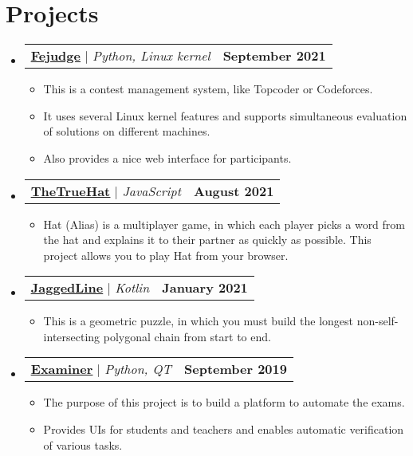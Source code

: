 \documentclass[letterpaper,11pt]{article}
\makeatletter
\newcommand{\resumeItem}[1]{
    \item\small{
        {#1 \vspace{-2pt}}
    }
}
\newcommand{\resumeProjectHeading}[2]{
    \item
    \begin{tabular*}{1.001\textwidth}{l@{\extracolsep{\fill}}r}
        \small#1 & \textbf{\small #2}\\
    \end{tabular*}\vspace{-7pt}
}
\newcommand{\resumeSubHeadingListStart}{\begin{itemize}[leftmargin=0.0in, label={}]}
\newcommand{\resumeSubHeadingListEnd}{\end{itemize}}
\newcommand{\resumeItemListStart}{\begin{itemize}}
\newcommand{\resumeItemListEnd}{\end{itemize}\vspace{-5pt}}
\makeatother
\begin{document}
\section{Projects}
    \vspace{-5pt}
    \resumeSubHeadingListStart
    \resumeProjectHeading
        {\textbf{\href{https://github.com/m20-sch57/Fejudge}{\underline{Fejudge}}} $|$ \emph{Python, Linux kernel}}{September 2021}
        \resumeItemListStart
            \resumeItem{This is a contest management system, like Topcoder or Codeforces.}
            \resumeItem{It uses several Linux kernel features and supports simultaneous evaluation of solutions on different machines.}
            \resumeItem{Also provides a nice web interface for participants.}
        \resumeItemListEnd
        \vspace{-13pt}
    \resumeProjectHeading
        {\textbf{\href{https://github.com/m20-sch57/thetruehat}{\underline{TheTrueHat}}} $|$ \emph{JavaScript}}{August 2021}
        \resumeItemListStart
            \resumeItem{Hat (Alias) is a multiplayer game, in which each player picks a word from the hat and explains it to their partner as quickly as possible. This project allows you to play Hat from your browser.}
        \resumeItemListEnd 
        \vspace{-13pt}
    \resumeProjectHeading
        {\textbf{\href{https://github.com/JaggedLine/KotlinLine}{\underline{JaggedLine}}} $|$ \emph{Kotlin}}{January 2021}
        \resumeItemListStart
            \resumeItem{This is a geometric puzzle, in which you must build the longest non-self-intersecting polygonal chain from start to end.}
        \resumeItemListEnd
        \vspace{-13pt}
    \resumeProjectHeading
        {\textbf{\href{https://github.com/m20-sch57/exam-system}{\underline{Examiner}}} $|$ \emph{Python, QT}}{September 2019}
        \resumeItemListStart
            \resumeItem{The purpose of this project is to build a platform to automate the exams.}
            \resumeItem{Provides UIs for students and teachers and enables automatic verification of various tasks.}
        \resumeItemListEnd
    \resumeSubHeadingListEnd
\vspace{-15pt}


\end{document}
